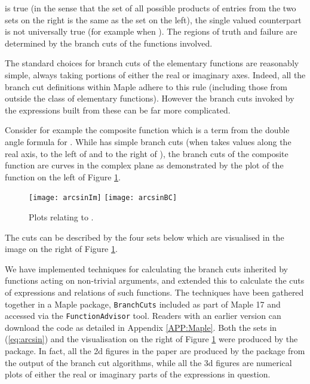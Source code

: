 \documentclass{llncs}
\begin{document}
is true (in the sense that the set of all possible products of entries from the two sets on the right is the same as the set on the left), the single valued counterpart 
 is not universally true (for example when ).  The regions of truth and failure are determined by the branch cuts of the functions involved.  

The standard choices for branch cuts of the elementary functions are reasonably simple, always taking portions of either the real or imaginary axes.  Indeed, all the branch cut definitions within {\sc Maple} adhere to this rule (including those from outside the class of elementary functions).  However the branch cuts invoked by the expressions built from these can be far more complicated.  

Consider for example the composite function  which is a term from the double angle formula for .  While  has simple branch cuts (when  takes values along the real axis, to the left of  and to the right of ), the branch cuts of the composite function are curves in the complex plane as demonstrated by the plot of the function on the left of Figure \ref{fig:arcsin}.  

\begin{figure}[ht] 
\begin{center}
\texttt{[image: arcsinIm]}
\hspace*{0.3cm}
\texttt{[image: arcsinBC]}
\end{center}
\caption{Plots relating to .} 
\label{fig:arcsin}
\end{figure}
The cuts can be described by the four sets below which are visualised in the image on the right of Figure \ref{fig:arcsin}.


We have implemented techniques for calculating the branch cuts inherited by functions acting on non-trivial arguments, and extended this to calculate the cuts of expressions and relations of such functions.  The techniques have been gathered together in a {\sc Maple} package, \texttt{BranchCuts} included as part of {\sc Maple 17} and accessed via the \texttt{FunctionAdvisor} tool. Readers with an earlier version can download the code as detailed in Appendix \ref{APP:Maple}.  Both the sets in (\ref{eq:arcsin}) and the visualisation on the right of Figure \ref{fig:arcsin} were produced by the package.  In fact, all the 2d figures in the paper are produced by the package from the output of the branch cut algorithms, while all the 3d figures are numerical plots of either the real or imaginary parts of the expressions in question.  
\end{document}
